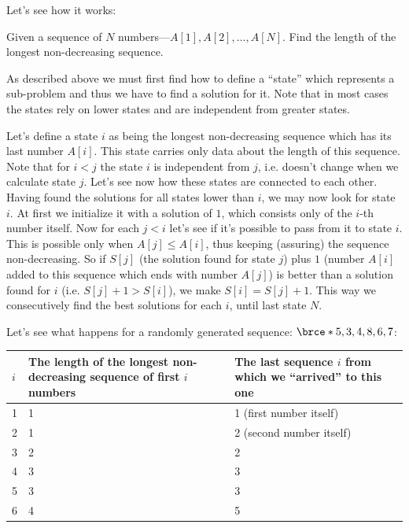 Let's see how it works:

Given a sequence of $N$ numbers---$A[1],A[2],\ldots,A[N]$. Find the length
of the longest non-decreasing sequence.

As described above we must first find how to define a ``state''  which represents a sub-problem and thus we have to find a
solution for it. Note that in most cases the states rely on lower states and
are independent from greater states.

Let's define a state $i$ as being the longest non-decreasing sequence which
has its last number $A[i]$. This state carries only data about the length of
this sequence. Note that for $i<j$ the state $i$ is independent from $j$,
i.e.  doesn't change when we calculate state $j$. Let's see now how these
states are connected to each other. Having found the solutions for all
states lower than $i$, we may now look for state $i$. At first we initialize
it with a solution of $1$, which consists only of the $i$-th number itself.
Now for each $j<i$ let's see if it's possible to pass from it to state $i$.
This is possible only when $A[j]\leq A[i]$, thus keeping (assuring) the
sequence non-decreasing. So if $S[j]$ (the solution found for state $j$)
plus $1$ (number $A[i]$ added to this sequence which ends with number
$A[j]$) is better than a solution found for $i$ (i.e. $S[j]+1>S[i]$), we
make $S[i]=S[j]+1$. This way we consecutively find the best solutions for
each $i$, until last state $N$.

Let's see what happens for a randomly generated sequence: $\brce*{5, 3, 4,
  8, 6, 7}$:

\begingroup
\renewcommand*{\arraystretch}{\arraystretchsize}
\begin{footnotesize}
\begin{longtable}{|l|p{6cm}|p{6cm}|}
\hline
\endfirsthead
\hline
\endlastfoot
$i$&The length of the longest non-decreasing sequence of first $i$ numbers
&The last sequence $i$ from which we ``arrived'' to this one\\\hline
1&1&1 (first number itself)\\\hline
2&1&2 (second number itself)\\\hline
3&2&2\\\hline
4&3&3\\\hline
5&3&3\\\hline
6&4&5\\
\end{longtable}
\end{footnotesize}
\endgroup

